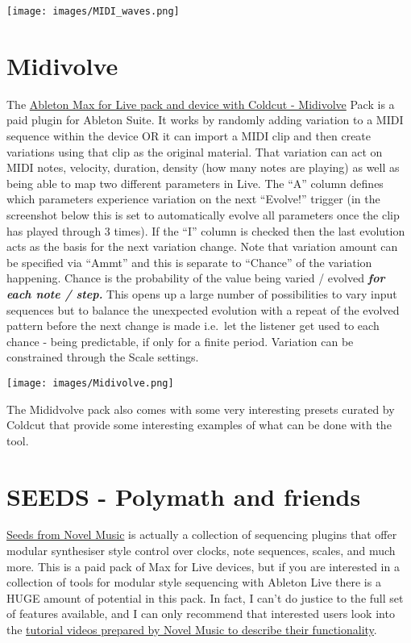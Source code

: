 \documentclass[
  12pt,
  letterpaper,
  oneside,
  open=any]{scrbook}
\begin{document}
\texttt{[image: images/MIDI\_waves.png]}

\section{Midivolve}\label{midivolve}

The \href{https://www.ableton.com/en/packs/midivolve/}{Ableton Max for
Live pack and device with Coldcut - Midivolve} Pack is a paid plugin for
Ableton Suite. It works by randomly adding variation to a MIDI sequence
within the device OR it can import a MIDI clip and then create
variations using that clip as the original material. That variation can
act on MIDI notes, velocity, duration, density (how many notes are
playing) as well as being able to map two different parameters in Live.
The ``A'' column defines which parameters experience variation on the
next ``Evolve!'' trigger (in the screenshot below this is set to
automatically evolve all parameters once the clip has played through 3
times). If the ``I'' column is checked then the last evolution acts as
the basis for the next variation change. Note that variation amount can
be specified via ``Ammt'' and this is separate to ``Chance'' of the
variation happening. Chance is the probability of the value being varied
/ evolved \textbf{\emph{for each note / step.}} This opens up a large
number of possibilities to vary input sequences but to balance the
unexpected evolution with a repeat of the evolved pattern before the
next change is made i.e.~let the listener get used to each chance -
being predictable, if only for a finite period. Variation can be
constrained through the Scale settings.

\texttt{[image: images/Midivolve.png]}

The Mididvolve pack also comes with some very interesting presets
curated by Coldcut that provide some interesting examples of what can be
done with the tool.

\section{SEEDS - Polymath and
friends}\label{seeds---polymath-and-friends}

\href{https://www.novelmusic.org/m4l/seeds}{Seeds from Novel Music} is
actually a collection of sequencing plugins that offer modular
synthesiser style control over clocks, note sequences, scales, and much
more. This is a paid pack of Max for Live devices, but if you are
interested in a collection of tools for modular style sequencing with
Ableton Live there is a HUGE amount of potential in this pack. In fact,
I can't do justice to the full set of features available, and I can only
recommend that interested users look into the
\href{https://youtube.com/playlist?list=PLjyWHWk9AS6MMpgD88K4U6TICgEjjClFR}{tutorial
videos prepared by Novel Music to describe their functionality}.
\end{document}
